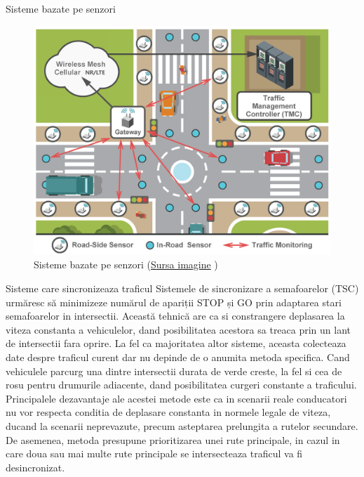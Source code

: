 \documentclass{beamer}
\begin{document}
    \begin{frame}{Sisteme bazate pe senzori}
        \begin{figure}[h!]
            \includegraphics[width=(\textwidth / 4) * 3]{SensorsBasedTrafficControlSystemRepresentation.png}
            \caption{Sisteme bazate pe senzori 
            (\href{https://www.researchgate.net/figure/Communications-chain-of-data-feeds-in-smart-transportation_fig3_309740417}{Sursa imagine} \textcopyright)}
            \label{fig:SensorRecognitionSystem}
        \end{figure}
    \end{frame}

    \begin{frame}{Sisteme care sincronizeaza traficul}
        Sistemele de sincronizare a semafoarelor (TSC) urmăresc să minimizeze
        numărul de apariții STOP și GO prin adaptarea stari semafoarelor in intersectii.
        Această tehnică are ca si constrangere deplasarea la viteza constanta a vehiculelor,
        dand posibilitatea acestora sa treaca prin un lant de intersectii fara 
        oprire. La fel ca majoritatea altor sisteme, aceasta colecteaza 
        date despre traficul curent dar nu depinde de o anumita metoda specifica. 
        Cand vehiculele parcurg una dintre intersectii durata de verde creste, 
        la fel si cea de rosu pentru drumurile adiacente, dand posibilitatea curgeri 
        constante a traficului. \\
        Principalele dezavantaje ale acestei metode este ca in scenarii reale 
        conducatori nu vor respecta conditia de deplasare constanta in normele 
        legale de viteza, ducand la scenarii neprevazute, precum asteptarea 
        prelungita a rutelor secundare. De asemenea, metoda presupune prioritizarea 
        unei rute principale, in cazul in care doua sau mai multe rute principale 
        se intersecteaza traficul va fi desincronizat.

    \end{frame}
\end{document}
